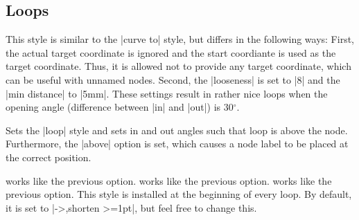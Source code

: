 \subsection{Loops}

\begin{itemize}
  This style is similar to the |curve to| style, but differs in the
  following ways: First, the actual target coordinate is ignored and the
  start coordiante is used as the target coordinate. Thus, it is
  allowed not to provide any target coordinate, which can be useful
  with unnamed nodes. Second, the |looseness| is set to |8| and the
  |min distance| to |5mm|. These settings result in rather nice loops
  when the opening angle (difference between |in| and |out|) is
  30$^\circ$.
\begin{codeexample}[]
\end{codeexample}
  Sets the |loop| style and sets in and out angles such that
  loop is above the node. Furthermore, the |above| option is set,
  which causes a node label to be placed at the correct position. 
\begin{codeexample}[]
\end{codeexample}
   works like the previous option.
   works like the previous option.
   works like the previous option.
   This style is installed at the beginning of
  every loop. By default, it is set to |->,shorten >=1pt|, but feel
  free to change this.
\begin{codeexample}[]
\end{codeexample}
\end{itemize}



